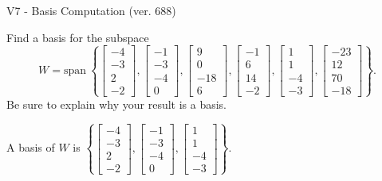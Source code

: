\begin{exercise}
  \begin{exerciseTitle}V7 - Basis Computation (ver. 688)\end{exerciseTitle}
  \begin{exerciseStatement}
    Find a basis for the subspace 
\[W=\mathrm{span}\ \left\{\left[\begin{array}{r}
-4 \\
-3 \\
2 \\
-2
\end{array}\right] , \left[\begin{array}{r}
-1 \\
-3 \\
-4 \\
0
\end{array}\right] , \left[\begin{array}{r}
9 \\
0 \\
-18 \\
6
\end{array}\right] , \left[\begin{array}{r}
-1 \\
6 \\
14 \\
-2
\end{array}\right] , \left[\begin{array}{r}
1 \\
1 \\
-4 \\
-3
\end{array}\right] , \left[\begin{array}{r}
-23 \\
12 \\
70 \\
-18
\end{array}\right]\right\}.\]
 Be sure to explain why your result is a basis.


  \end{exerciseStatement}
  \begin{exerciseAnswer}
   A basis of \(W\) is  \(\left\{\left[\begin{array}{r}
-4 \\
-3 \\
2 \\
-2
\end{array}\right] , \left[\begin{array}{r}
-1 \\
-3 \\
-4 \\
0
\end{array}\right] , \left[\begin{array}{r}
1 \\
1 \\
-4 \\
-3
\end{array}\right]\right\}\).
  


  \end{exerciseAnswer}
\end{exercise}